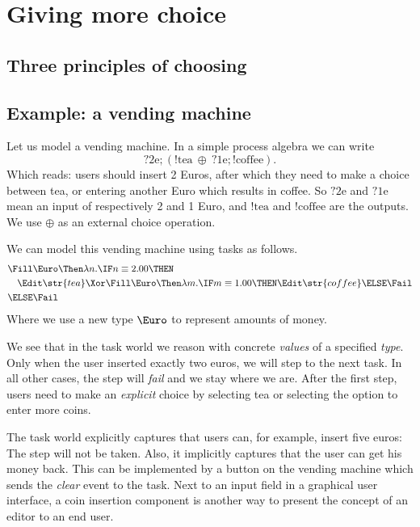 
\section{Giving more choice}


\subsection{Three principles of choosing}


\subsection{Example: a vending machine}

Let us model a vending machine.
In a simple process algebra we can write
\begin{equation*}
  ?\text{2e}; (!\text{tea}\ \oplus\ ?\text{1e}; !\text{coffee}).
\end{equation*}
Which reads:
users should insert 2 Euros,
after which they need to make a choice between tea,
or entering another Euro which results in coffee.
So $?\text{2e}$ and $?\text{1e}$ mean an input of respectively 2 and 1 Euro,
and $!\text{tea}$ and $!\text{coffee}$ are the outputs.
We use $\oplus$ as an external choice operation.

We can model this vending machine using tasks as follows.
\begin{align*}
  & \Fill \Euro \Then \lambda n.
  \IF n \equiv 2.00 \THEN \\
  &   \quad \Edit \str{tea}
    \Xor
      \Fill \Euro \Then \lambda m.
      \IF m \equiv 1.00 \THEN
        \Edit \str{coffee}
      \ELSE
        \Fail \\
  & \ELSE \Fail
\end{align*}
Where we use a new type $\Euro$ to represent amounts of money.

We see that in the task world we reason with concrete \emph{values} of a specified \emph{type}.
Only when the user inserted exactly two euros,
we will step to the next task.
In all other cases,
the step will \emph{fail} and we stay where we are.
After the first step,
users need to make an \emph{explicit} choice by selecting tea or selecting the option to enter more coins.

The task world explicitly captures that users can, for example, insert five euros:
The step will not be taken.
Also, it implicitly captures that the user can get his money back.
This can be implemented by a button on the vending machine which sends the \emph{clear} event to the task.
Next to an input field in a graphical user interface,
a coin insertion component is another way to present the concept of an editor to an end user.



